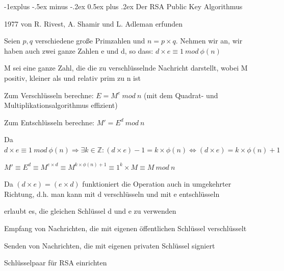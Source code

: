 \documentclass[a4paper]{article}
\makeatletter
\renewcommand{\subsection}{\@startsection{subsection}{2}{0mm}%
 {-1explus -.5ex minus -.2ex}%
 {0.5ex plus .2ex}%
 {\normalfont\normalsize\bfseries}}
\makeatother
\begin{document}
\begin{multicols}{3}
      \subsection{Der RSA Public Key Algorithmus}
      \begin{itemize*}
            \item 1977 von R. Rivest, A. Shamir und L. Adleman erfunden %
            \item Seien $p, q$ verschiedene große Primzahlen und $n=p\times q$. Nehmen wir an, wir haben auch zwei ganze Zahlen e und d, so dass: $d\times e \equiv 1\ mod\ \phi(n)$
            \item M sei eine ganze Zahl, die die zu verschlüsselnde Nachricht darstellt, wobei M positiv, kleiner als und relativ prim zu n ist
            \item Zum Verschlüsseln berechne: $E = M^e\ mod\ n$ (mit dem Quadrat- und Multiplikationsalgorithmus effizient)
            \item Zum Entschlüsseln berechne: $M'=E^d\ mod\ n$
            \begin{itemize*}
                  \item Da $d\times e\equiv 1\ mod\ \phi(n)\Rightarrow\exists k\in\mathbb{Z}:(d\times e)-1=k\times\phi(n)\Leftrightarrow(d\times e)=k\times\phi(n)+1$
                  \item $M'\equiv E^d\equiv M^{e\times d}\equiv M^{k\times\phi(n)+1}\equiv 1^k\times M\equiv M\ mod\ n$
            \end{itemize*}
            \item Da $(d\times e)=(e\times d)$ funktioniert die Operation auch in umgekehrter Richtung, d.h. man kann mit d verschlüsseln und mit e entschlüsseln
            \begin{itemize*}
                  \item erlaubt es, die gleichen Schlüssel d und e zu verwenden
                  \item Empfang von Nachrichten, die mit eigenen öffentlichen Schlüssel verschlüsselt
                  \item Senden von Nachrichten, die mit eigenen privaten Schlüssel signiert
            \end{itemize*}
            \item Schlüsselpaar für RSA einrichten

\end{itemize*}
\end{multicols}
\end{document}
